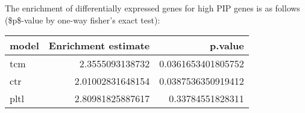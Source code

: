 The enrichment of differentially expressed genes for high PIP genes is as follows (\$p\$-value by one-way fisher's exact test):


\begin{center}
\begin{tabular}{lrr}
model & Enrichment estimate & p.value\\
\hline
tcm & 2.3555093138732 & 0.0361653401805752\\
ctr & 2.01002831648154 & 0.0387536350919412\\
pltl & 2.80981825887617 & 0.33784551828311\\
\end{tabular}
\end{center}
